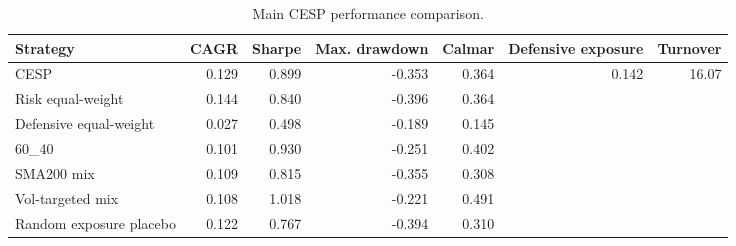 \begin{table}[H]
\centering
\caption{Main CESP performance comparison.}
\scriptsize
\begin{tabular}{lrrrrrr}
\toprule
Strategy & CAGR & Sharpe & Max. drawdown & Calmar & Defensive exposure & Turnover \\
\midrule
CESP & 0.129 & 0.899 & -0.353 & 0.364 & 0.142 & 16.07 \\
Risk equal-weight & 0.144 & 0.840 & -0.396 & 0.364 & & \\
Defensive equal-weight & 0.027 & 0.498 & -0.189 & 0.145 & & \\
60\_40 & 0.101 & 0.930 & -0.251 & 0.402 & & \\
SMA200 mix & 0.109 & 0.815 & -0.355 & 0.308 & & \\
Vol-targeted mix & 0.108 & 1.018 & -0.221 & 0.491 & & \\
Random exposure placebo & 0.122 & 0.767 & -0.394 & 0.310 & & \\
\bottomrule
\end{tabular}
\end{table}
